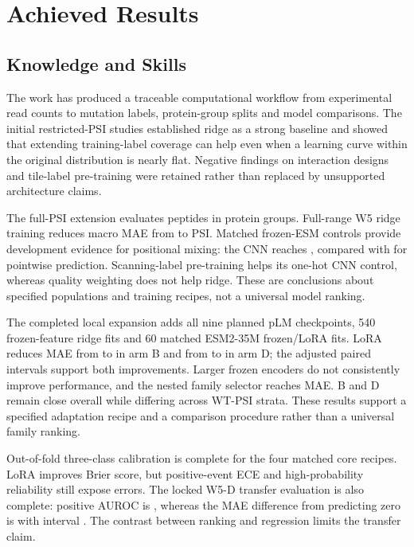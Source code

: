 \label{chap:conclusion}
\ThesisFlatNumbering

\section{Achieved Results}
\subsection{Knowledge and Skills}
The work has produced a traceable computational workflow from experimental read counts to mutation
labels, protein-group splits and model comparisons. The initial restricted-PSI studies established
ridge as a strong baseline and showed that extending training-label coverage can help even when a
learning curve within the original distribution is nearly flat. Negative findings on interaction
designs and tile-label pre-training were retained rather than replaced by unsupported architecture claims.

The full-PSI extension evaluates \nVthreeNPeptides{} peptides in \nVthreeNGroups{} protein groups.
Full-range W5 ridge training reduces macro MAE from \nVthreeRidgeB{} to \nVthreeRidgeD{} PSI.
Matched frozen-ESM controls provide development evidence for positional mixing: the CNN reaches
\nVthreeCnnD{}, compared with \nVthreePointwiseD{} for pointwise prediction. Scanning-label
pre-training helps its one-hot CNN control, whereas quality weighting does not help ridge.
These are conclusions about specified populations and training recipes, not a universal model ranking.

The completed local expansion adds all nine planned pLM checkpoints, 540 frozen-feature ridge fits
and 60 matched ESM2-35M frozen/LoRA fits. LoRA reduces MAE from \nCampaignFrozenB{} to
\nCampaignLoraB{} in arm B and from \nCampaignFrozenD{} to \nCampaignLoraD{} in arm D;
the adjusted paired intervals support both improvements. Larger frozen encoders do not consistently
improve performance, and the nested family selector reaches \nCampaignNested{} MAE. B and D
remain close overall while differing across WT-PSI strata. These results support a specified adaptation
recipe and a comparison procedure rather than a universal family ranking.

Out-of-fold three-class calibration is complete for the four matched core recipes. LoRA improves
Brier score, but positive-event ECE and high-probability reliability still expose errors. The locked
W5-D transfer evaluation is also complete: positive AUROC is \nCampaignTAuc{}, whereas the MAE
difference from predicting zero is \nCampaignTDelta{} with interval \nCampaignTCI{}.
The contrast between ranking and regression limits the transfer claim.

